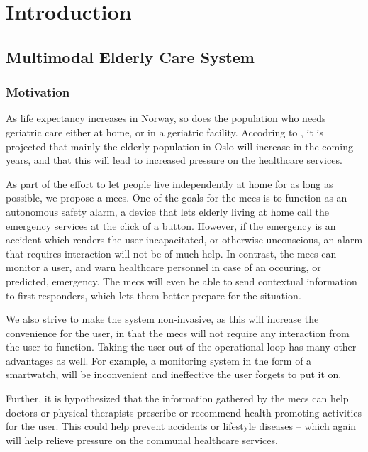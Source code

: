 \chapter{Introduction}

\section{Multimodal Elderly Care System}
\subsection{Motivation}
As life expectancy increases in Norway, so does the population who needs geriatric care either at home, or in a geriatric facility. Accodring to \cite{oslohelsa}, it is projected that mainly the elderly population in Oslo will increase in the coming years, and that this will lead to increased pressure on the healthcare services.

As part of the effort to let people live independently at home for as long as possible, we propose a \gls{mecs}. One of the goals for the \gls{mecs} is to function as an autonomous safety alarm, a device that lets elderly living at home call the emergency services at the click of a button. However, if the emergency is an accident which renders the user incapacitated, or otherwise unconscious, an alarm that requires interaction will not be of much help. In contrast, the \gls{mecs} can monitor a user, and warn healthcare personnel in case of an occuring, or predicted, emergency. The \gls{mecs} will even be able to send contextual information to first-responders, which lets them better prepare for the situation.

We also strive to make the system non-invasive, as this will increase the convenience for the user, in that the \gls{mecs} will not require any interaction from the user to function. Taking the user out of the operational loop has many other advantages as well. For example, a monitoring system in the form of a smartwatch, will be inconvenient and ineffective the user forgets to put it on.

Further, it is hypothesized that the information gathered by the \gls{mecs} can help doctors or physical therapists prescribe or recommend health-promoting activities for the user. This could help prevent accidents or lifestyle diseases -- which again will help relieve pressure on the communal healthcare services.

